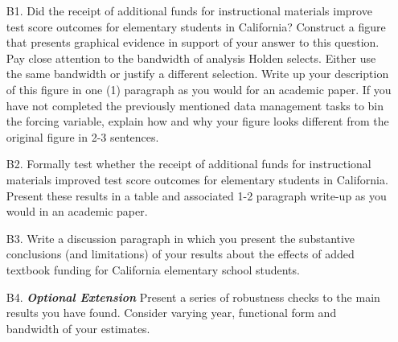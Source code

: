 \documentclass[a4paper, 11pt]{article}
\begin{document}
\begin{enumerate}
	\item[B1.] Did the receipt of additional funds for instructional materials improve test score outcomes for elementary students in California? Construct a figure that presents graphical evidence in support of your answer to this question. Pay close attention to the bandwidth of analysis Holden selects. Either use the same bandwidth or justify a different selection. Write up your description of this figure in one (1) paragraph as you would for an academic paper. If you have not completed the previously mentioned data management tasks to bin the forcing variable, explain how and why your figure looks different from the original figure in 2-3 sentences.
	\item[B2.] Formally test whether the receipt of additional funds for instructional materials improved test score outcomes for elementary students in California. Present these results in a table and associated 1-2 paragraph write-up as you would in an academic paper.
	\item[B3.] Write a discussion paragraph in which you present the substantive conclusions (and limitations) of your results about the effects of added textbook funding for California elementary school students.
	\item[B4.] \textbf{\textit{Optional Extension}} Present a series of robustness checks to the main results you have found. Consider varying year, functional form and bandwidth of your estimates.
\end{enumerate}
\end{document}
